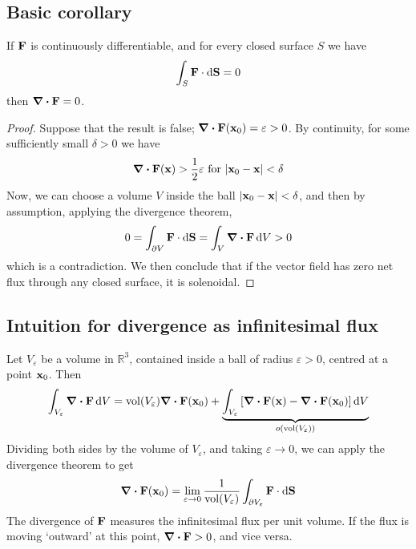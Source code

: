 \subsection{Basic corollary}
\begin{proposition}
	If \(\vb F\) is continuously differentiable, and for every closed surface \(S\) we have
	\[
		\int_S \vb F \cdot \dd{\vb S} = 0
	\]
	then \(\div{\vb F} = 0\).
\end{proposition}
\begin{proof}
	Suppose that the result is false; \(\div{\vb F}(\vb x_0) = \varepsilon > 0\).
	By continuity, for some sufficiently small \(\delta > 0\) we have
	\[
		\div{\vb F}(\vb x) > \frac{1}{2} \varepsilon \text{ for } \abs{\vb x_0 - \vb x} < \delta
	\]
	Now, we can choose a volume \(V\) inside the ball \(\abs{\vb x_0 - \vb x} < \delta\), and then by assumption, applying the divergence theorem,
	\[
		0 = \int_{\partial V} \vb F \cdot \dd{\vb S} = \int_V \div{\vb F} \dd{V} > 0
	\]
	which is a contradiction.
	We then conclude that if the vector field has zero net flux through any closed surface, it is solenoidal.
\end{proof}

\subsection{Intuition for divergence as infinitesimal flux}
Let \(V_\varepsilon\) be a volume in \(\mathbb R^3\), contained inside a ball of radius \(\varepsilon > 0\), centred at a point \(\vb x_0\).
Then
\[
	\int_{V_\varepsilon} \div{\vb F} \dd{V} = \mathrm{vol}(V_\varepsilon) \div{\vb F}(\vb x_0) + \underbrace{\int_{V_\varepsilon}  \left[ \div{\vb F}(\vb x) - \div{\vb F}(\vb x_0) \right] \dd{V}}_{o(\mathrm{vol}(V_\varepsilon))}
\]
Dividing both sides by the volume of \(V_\varepsilon\), and taking \(\varepsilon \to 0\), we can apply the divergence theorem to get
\[
	\div{\vb F}(\vb x_0) = \lim_{\varepsilon \to 0} \frac{1}{\mathrm{vol}(V_\varepsilon)} \int_{\partial V_\varepsilon} \vb F \cdot \dd{\vb S}
\]
The divergence of \(\vb F\) measures the infinitesimal flux per unit volume.
If the flux is moving `outward' at this point, \(\div{\vb F} > 0\), and vice versa.

